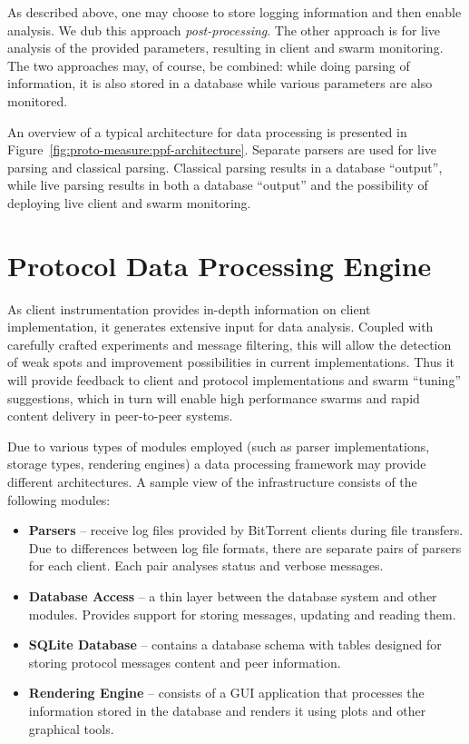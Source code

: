 As described above, one may choose to store logging information and then
enable analysis. We dub this approach \textit{post-processing}. The other
approach is for live analysis of the provided parameters, resulting in client
and swarm monitoring. The two approaches may, of course, be combined: while
doing parsing of information, it is also stored in a database while various
parameters are also monitored.

An overview of a typical architecture for data processing is presented in
Figure~\ref{fig:proto-measure:ppf-architecture}. Separate parsers are used for live parsing and
classical parsing. Classical parsing results in a database ``output'', while
live parsing results in both a database ``output'' and the possibility of
deploying live client and swarm monitoring.

\section{Protocol Data Processing Engine}
\label{sec:proto-measure:data-processing}

As client instrumentation provides in-depth information on client
implementation, it generates extensive input for data analysis. Coupled
with carefully crafted experiments and message filtering, this will allow
the detection of weak spots and improvement possibilities in current
implementations. Thus it will provide feedback to client and protocol
implementations and swarm ``tuning'' suggestions, which in turn will enable
high performance swarms and rapid content delivery in peer-to-peer systems.

Due to various types of modules employed (such as parser implementations,
storage types, rendering engines) a data processing framework may provide
different architectures. A sample view of the infrastructure consists of the
following modules:

\begin{itemize}
  \item \textbf{Parsers} -- receive log files provided by BitTorrent
clients during file transfers. Due to differences between log file formats,
there are separate pairs of parsers for each client. Each pair analyses status
and verbose messages.
  \item \textbf{Database Access} -- a thin layer between the database system and
other modules. Provides support for storing messages, updating and reading
them.
  \item \textbf{SQLite Database} -- contains a database schema with tables
designed for storing protocol messages content and peer information.
  \item \textbf{Rendering Engine} -- consists of a GUI application that
processes the information stored in the database and renders it using plots
and other graphical tools.
\end{itemize}

